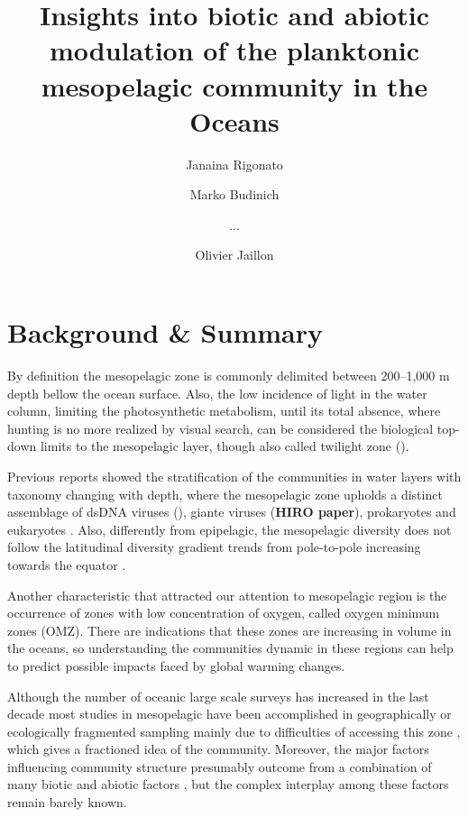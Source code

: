 \documentclass[fleqn,10pt]{wlscirep}
\title{Insights into biotic and abiotic modulation of the planktonic mesopelagic community in the Oceans}
\author[1,$\dag$]{Janaina Rigonato}
\author[2,$\dag$]{Marko Budinich}
\author[1,2]{...}
\author[1,*]{Olivier Jaillon}
\affil[1]{Genoscope, department, Evry, postcode, country}
\affil[2]{GO-SEE, department, Roscoff, postcode, country}
\affil[*]{corresponding author(s): Olivier Jaillon (corresponding.author@email.example)}
\affil[$\dag$]{these authors contributed equally to this work}
\begin{document}
\flushbottom
\maketitle

\thispagestyle{empty}



\section*{Background \& Summary}

By definition the mesopelagic zone is commonly delimited between 200–1,000 m depth bellow the ocean surface. Also, the low incidence of light in the water column, limiting the photosynthetic metabolism, until its total absence, where hunting is no more realized by visual search, can be considered the biological top-down limits to the mesopelagic layer, though also called twilight zone (\cite{robinson_mesopelagic_2010}).

Previous reports showed the stratification of the communities in water layers with taxonomy changing with depth, where the mesopelagic zone upholds a distinct assemblage  of dsDNA viruses (\cite{gregory_marine_2019}), giante viruses (\textbf{HIRO paper}), prokaryotes \cite{sunagawa_structure_2015,salazar_gene_2019} and eukaryotes \cite{giner_marked_2020}. Also, differently from epipelagic, the mesopelagic diversity does not follow the latitudinal diversity gradient trends from pole-to-pole increasing towards the equator \cite{ibarbalz_global_2019}.

Another characteristic that attracted our attention to mesopelagic region is the occurrence of zones with low concentration of oxygen, called oxygen minimum zones (OMZ). There are indications that these zones are increasing in volume in the oceans, so understanding the communities dynamic in these regions can help to predict possible impacts faced by global warming changes.

Although the number of oceanic large scale surveys has increased in the last decade \cite{rusch_sorcerer_2007,karsenti_holistic_2011,pernice_global_2015} most studies in mesopelagic have been accomplished in geographically or ecologically fragmented sampling mainly due to difficulties of accessing this zone \cite{hidalgo_developing_2019}, which gives a fractioned idea of the community. Moreover, the major factors influencing community structure presumably outcome from a combination of many biotic and abiotic factors \cite{lima-mendez_determinants_2015, louca_integrating_2016}, but the complex interplay among these factors remain barely known.
\end{document}
